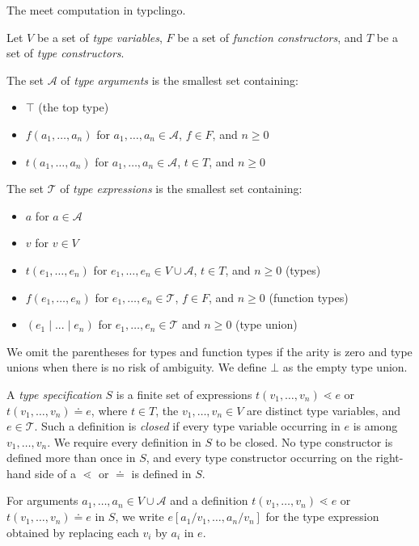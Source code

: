 \documentclass[a4paper]{amsart}
\begin{document}
The meet computation in typclingo.

Let $V$ be a set of \emph{type variables},
$F$ be a set of \emph{function constructors}, and
$T$ be a set of \emph{type constructors}.

The set $\mathcal{A}$ of \emph{type arguments} is the smallest set containing:
\begin{itemize}
	\item $\top$ (the top type)
    \item $f(a_1,\ldots,a_n)$ for $a_1,\ldots,a_n \in \mathcal{A}$, $f \in F$, and $n \ge 0$
    \item $t(a_1,\ldots,a_n)$ for $a_1,\ldots,a_n \in \mathcal{A}$, $t \in T$, and $n \ge 0$
\end{itemize}

The set $\mathcal{T}$ of \emph{type expressions} is the smallest set containing:
\begin{itemize}
    \item $a$ for $a \in \mathcal{A}$
    \item $v$ for $v \in V$
    \item $t(e_1,\dots,e_n)$ for $e_1,\dots,e_n \in V \cup \mathcal{A}$, $t \in T$, and $n \geq 0$ (types)
	\item $f(e_1,\dots,e_n)$ for $e_1,\dots,e_n \in \mathcal{T}$, $f \in F$, and $n \geq 0$ (function types)
	\item $(e_1 \mid ... \mid e_n)$ for $e_1,\dots,e_n \in \mathcal{T}$ and $n \geq 0$ (type union)
\end{itemize}

We omit the parentheses for types and function types if the arity is zero
and type unions when there is no risk of ambiguity.
We define $\bot$ as the empty type union.

A \emph{type specification} $S$ is a finite set of expressions
$t(v_1,\dots,v_n) \lessdot e$ or $t(v_1,\dots,v_n) \doteq e$,
where $t \in T$, the $v_1,\dots,v_n \in V$ are distinct type variables,
and $e \in \mathcal{T}$. Such a definition is \emph{closed} if every type variable
occurring in $e$ is among $v_1,\dots,v_n$. We require every definition in $S$ to be closed.
No type constructor is defined more than once in $S$,
and every type constructor occurring on the right-hand side of a $\lessdot$ or $\doteq$ is defined in $S$.

For arguments $a_1,\dots,a_n \in V \cup \mathcal{A}$ and a definition $t(v_1,\dots,v_n) \lessdot e$
or $t(v_1,\dots,v_n) \doteq e$ in $S$, we write $e[a_1/v_1,\dots,a_n/v_n]$ for the type expression
obtained by replacing each $v_i$ by $a_i$ in $e$.
\end{document}
